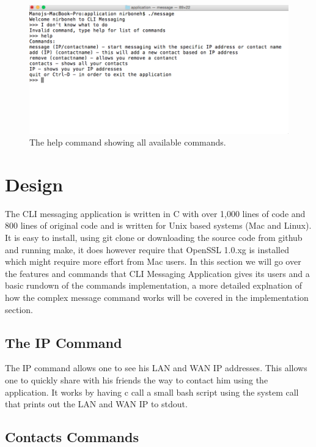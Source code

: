 \documentclass[twoside]{article}
\begin{document}
\begin{multicols}{2}
\begin{figure} %
\includegraphics[width=1\textwidth,natwidth=894,natheight=444]{help.png}
\caption 
{The help command showing all available commands.}
\end{figure}

\section{Design}

The CLI messaging application is written in C with over 1,000 lines of code and 800 lines of original code and is written for Unix based systems (Mac and Linux). It is easy to install, using git clone or downloading the source code from github and running make, it does however require that OpenSSL 1.0.xg is installed which might require more effort from Mac users. In this section we will go over the features and commands that CLI Messaging Application gives its users and a basic rundown of the commands implementation, a more detailed explnation of how the complex message command works will be covered in the implementation section. 

\subsection{The IP Command}

The IP command allows one to see his LAN and WAN IP addresses. This allows one to quickly share with his friends the way to contact him using the application. It works by having c call a small bash script using the system call that prints out the LAN and WAN IP to stdout.

\subsection{Contacts Commands}


\end{multicols}
\end{document}
